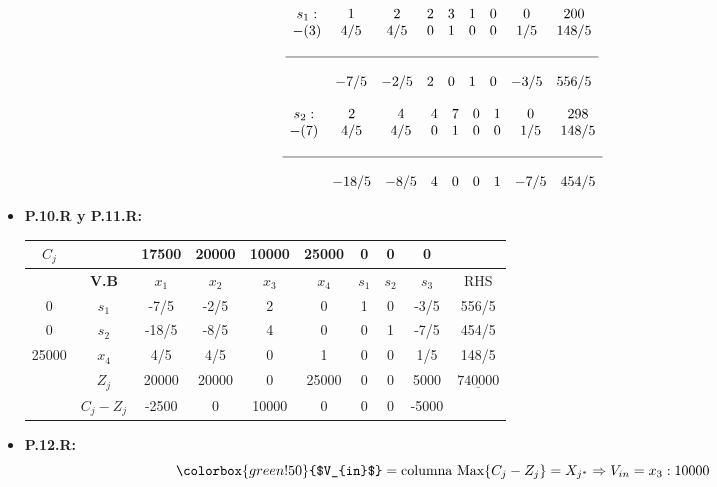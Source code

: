 \documentclass{templateNote}
\begin{document}
\begin{itemize}
    \begin{equation*}
        \begin{array}{ccccccccc}
            s_1: & 1 & 2 & 2 & 3 & 1 & 0 & 0 & 200 \\
            -(3) & 4/5 & 4/5 & 0 & 1 & 0 & 0 & 1/5 & 148/5 \\
            \\ \hline \\
            & -7/5 & -2/5 & 2 & 0 & 1 & 0 & -3/5 & 556/5
        \end{array}
    \end{equation*}
    
    \begin{equation*}
        \begin{array}{ccccccccc}
            s_2: & 2 & 4 & 4 & 7 & 0 & 1 & 0 & 298 \\
            -(7) & 4/5 & 4/5 & 0 & 1 & 0 & 0 & 1/5 & 148/5 \\
            \\ \hline \\
            & -18/5 & -8/5 & 4 & 0 & 0 & 1 & -7/5 & 454 /5
        \end{array}
    \end{equation*}

    \item \textbf{P.10.R y P.11.R:}
    \begin{center}
        \begin{tabular}{|c|c|c|c|c|c|c|c|c|c|}
            \hline
            $C_j$ & & 17500 & 20000 & 10000 & 25000 & 0 & 0 & 0 & \\ \hline
            & \textbf{V.B} & $x_1$ & $x_2$ & $x_3$ & $x_4$ & $s_1$ & $s_2$ & $s_3$ & RHS \\ \hline
            0 & $s_1$ & -7/5 & -2/5 & 2 & 0 & 1 & 0 & -3/5 & 556/5 \\
            0 & $s_2$ & -18/5 & -8/5 & 4 & 0 & 0 & 1 & -7/5 & 454/5 \\
            25000 & $x_4$ & 4/5 & 4/5 & 0 & 1 & 0 & 0 & 1/5 & 148/5 \\ \hline
            & $Z_j$ & 20000 & 20000 & 0 & 25000 & 0 & 0 & 5000 & $\underline{740000}$ \\ \hline
            & $C_j - Z_j$ & -2500 & 0 & 10000 & 0 & 0 & 0 & -5000 & \\ \hline
        \end{tabular}
    \end{center}

    \item \textbf{P.12.R:}
    \begin{equation*}
        \colorbox{green!50}{$V_{in}$} = \text{columna Max} \{C_j-Z_j\} = X_{j^*} \Rightarrow V_{in} = x_3 : 10000
    \end{equation*}


\end{itemize}
\end{document}
